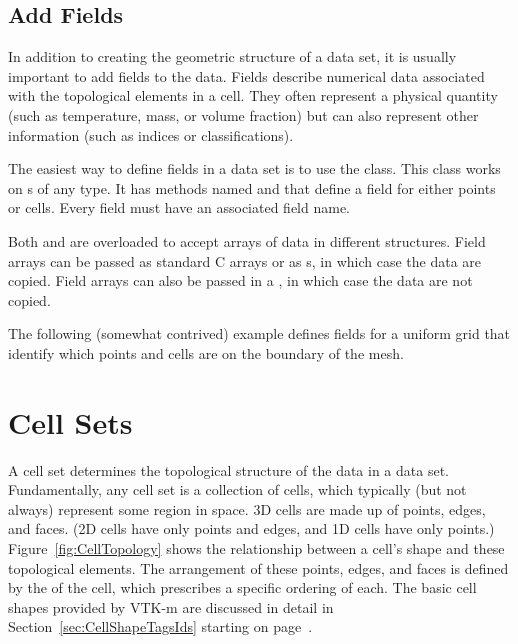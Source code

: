 \subsection{Add Fields}

In addition to creating the geometric structure of a data set, it is
usually important to add fields to the data. Fields describe numerical data
associated with the topological elements in a cell. They often represent a
physical quantity (such as temperature, mass, or volume fraction) but can
also represent other information (such as indices or classifications).

The easiest way to define fields in a data set is to use the
 class. This class works on
s of any type. It has methods named
 and  that define a field
for either points or cells. Every field must have an associated field name.

Both  and  are overloaded to
accept arrays of data in different structures. Field arrays can be passed
as standard C arrays or as s, in which case the data
are copied. Field arrays can also be passed in a
, in which case the data are not copied.

The following (somewhat contrived) example defines fields for a uniform
grid that identify which points and cells are on the boundary of the mesh.



\section{Cell Sets}
\label{sec:DataSets:CellSets}


A cell set determines the topological structure of the data in a data set.
Fundamentally, any cell set is a collection of cells, which typically (but
not always) represent some region in space. 3D cells are made up of
points,
edges, and
faces. (2D cells have only points and edges,
and 1D cells have only points.) Figure~\ref{fig:CellTopology} shows the
relationship between a cell's shape and these topological elements. The
arrangement of these points, edges, and faces is defined by the
 of the
cell, which prescribes a specific ordering of each. The basic cell shapes
provided by VTK-m are discussed in detail in
Section~\ref{sec:CellShapeTagsIds} starting on
page~\pageref{sec:CellShapeTagsIds}.

